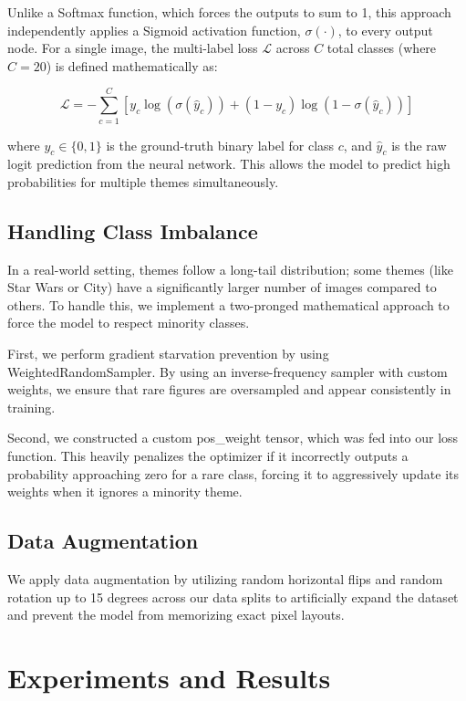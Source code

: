 \documentclass[11pt, a4paper]{article}
\theoremstyle{remark}
\begin{document}
Unlike a Softmax function, which forces the outputs to sum to 1, 
this approach independently applies a Sigmoid activation function, 
$\sigma(\cdot)$, to every output node. For a single image, the multi-label 
loss $\mathcal{L}$ across $C$ total classes (where $C=20$) is defined mathematically as:

\begin{equation}
    \mathcal{L} = -\sum_{c=1}^{C} \left[ y_c \log(\sigma(\hat{y}_c)) + (1 - y_c) \log(1 - \sigma(\hat{y}_c)) \right]
\end{equation}

\noindent where $y_c \in \{0, 1\}$ is the ground-truth binary label for
 class $c$, and $\hat{y}_c$ is the raw logit prediction from the neural
  network. This allows the model to predict high probabilities for multiple 
  themes simultaneously.
\subsection{Handling Class Imbalance}
In a real-world setting, themes follow a long-tail distribution; some themes (like Star Wars or City)
have a significantly larger number of images compared to others. To handle this, we implement a two-pronged mathematical approach
to force the model to respect minority classes.

First, we perform gradient starvation prevention by using WeightedRandomSampler. By using an inverse-frequency sampler with custom weights,
we ensure that rare figures are oversampled and appear consistently in training.

Second, we constructed a custom pos\_weight tensor, which was fed into our loss function. This heavily penalizes the optimizer if it incorrectly 
outputs a probability approaching zero for a rare class, forcing it to aggressively update its weights when it ignores a minority theme.

\subsection{Data Augmentation}
We apply data augmentation by utilizing random horizontal flips and random rotation up to 15 degrees across our data splits to artificially expand the dataset
and prevent the model from memorizing exact pixel layouts.

\section{Experiments and Results}
\end{document}
